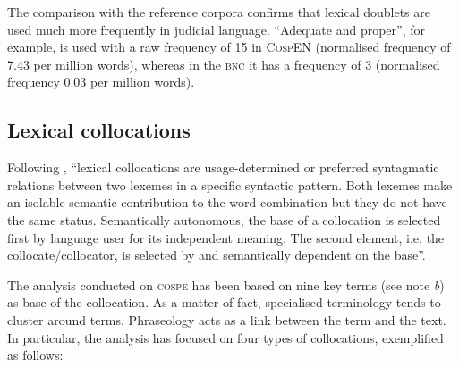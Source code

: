 \documentclass[output=paper]{LSP/langsci}
\begin{document}
The comparison with the reference corpora confirms that lexical doublets are used much more frequently in judicial language. “Adequate and proper”, for example, is used with a raw frequency of 15 in \textsc{CospEN} (normalised frequency of 7.43 per million words), whereas in the \textsc{bnc} it has a frequency of 3 (normalised frequency 0.03 per million words).

\subsection{Lexical collocations}
Following \citet[43]{Granger2008}, “lexical collocations are usage-deter\-mined or preferred syntagmatic relations between two lexemes in a specific syntactic pattern. Both lexemes make an isolable semantic contribution to the word combination but they do not have the same status. Semantically autonomous, the base of a collocation is selected first by language user for its independent meaning. The second element, i.e. the collocate/collocator, is selected by and semantically dependent on the base”.

The analysis conducted on \textsc{cospe} has been based on nine key terms (see note \textit{b}) as base of the \enlargethispage{1\baselineskip} collocation. As a matter of fact, specialised terminology tends to cluster around terms. Phraseology acts as a link between the term and the text. In particular, the analysis has focused on four types of collocations, exemplified as follows:
\end{document}
